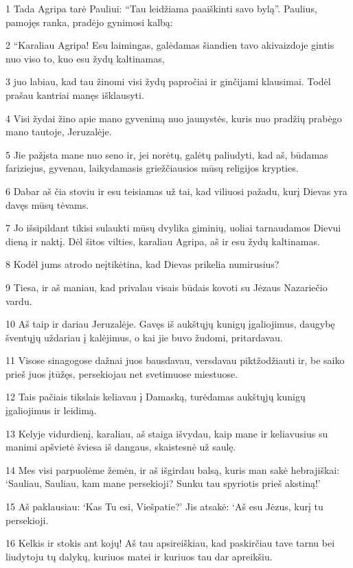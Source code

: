 \par 1 Tada Agripa tarė Pauliui: “Tau leidžiama paaiškinti savo bylą”. Paulius, pamojęs ranka, pradėjo gynimosi kalbą: 
\par 2 “Karaliau Agripa! Esu laimingas, galėdamas šiandien tavo akivaizdoje gintis nuo viso to, kuo esu žydų kaltinamas, 
\par 3 juo labiau, kad tau žinomi visi žydų papročiai ir ginčijami klausimai. Todėl prašau kantriai manęs išklausyti. 
\par 4 Visi žydai žino apie mano gyvenimą nuo jaunystės, kuris nuo pradžių prabėgo mano tautoje, Jeruzalėje. 
\par 5 Jie pažįsta mane nuo seno ir, jei norėtų, galėtų paliudyti, kad aš, būdamas fariziejus, gyvenau, laikydamasis griežčiausios mūsų religijos krypties. 
\par 6 Dabar aš čia stoviu ir esu teisiamas už tai, kad viliuosi pažadu, kurį Dievas yra davęs mūsų tėvams. 
\par 7 Jo išsipildant tikisi sulaukti mūsų dvylika giminių, uoliai tarnaudamos Dievui dieną ir naktį. Dėl šitos vilties, karaliau Agripa, aš ir esu žydų kaltinamas. 
\par 8 Kodėl jums atrodo neįtikėtina, kad Dievas prikelia numirusius? 
\par 9 Tiesa, ir aš maniau, kad privalau visais būdais kovoti su Jėzaus Nazariečio vardu. 
\par 10 Aš taip ir dariau Jeruzalėje. Gavęs iš aukštųjų kunigų įgaliojimus, daugybę šventųjų uždariau į kalėjimus, o kai jie buvo žudomi, pritardavau. 
\par 11 Visose sinagogose dažnai juos bausdavau, versdavau piktžodžiauti ir, be saiko prieš juos įtūžęs, persekiojau net svetimuose miestuose. 
\par 12 Tais pačiais tikslais keliavau į Damaską, turėdamas aukštųjų kunigų įgaliojimus ir leidimą. 
\par 13 Kelyje vidurdienį, karaliau, aš staiga išvydau, kaip mane ir keliavusius su manimi apšvietė šviesa iš dangaus, skaistesnė už saulę. 
\par 14 Mes visi parpuolėme žemėn, ir aš išgirdau balsą, kuris man sakė hebrajiškai: ‘Sauliau, Sauliau, kam mane persekioji? Sunku tau spyriotis prieš akstiną!’ 
\par 15 Aš paklausiau: ‘Kas Tu esi, Viešpatie?’ Jis atsakė: ‘Aš esu Jėzus, kurį tu persekioji. 
\par 16 Kelkis ir stokis ant kojų! Aš tau apsireiškiau, kad paskirčiau tave tarnu bei liudytoju tų dalykų, kuriuos matei ir kuriuos tau dar apreikšiu. 
